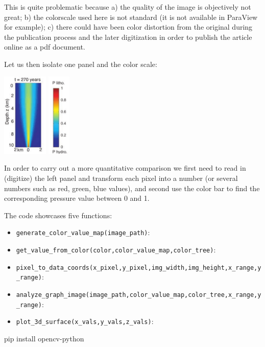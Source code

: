 This is quite problematic because a) the quality of the image is objectively not great; 
b) the colorscale used here is not standard (it is not available in ParaView for example); 
c) there could have been color distortion from the original during the publication 
process and the later digitization in order to publish the article online as a pdf document.

Let us then isolate one panel and the color scale:

\begin{center}
\includegraphics[height=4cm]{python_codes/fieldstone_170/images/graph_3_full}
\includegraphics[height=4cm]{python_codes/fieldstone_170/images/legenda}
\end{center}

In order to carry out a more quantitative comparison
we first need to read in (digitize) the left panel and transform each pixel into 
a number (or several numbers such as red, green, blue values), and second use the 
color bar to find the corresponding pressure value between 0 and 1.

The code showcases five functions:

\begin{itemize}
\item \lstinline{generate_color_value_map(image_path)}:
\item \lstinline{get_value_from_color(color,color_value_map,color_tree)}:
\item \lstinline{pixel_to_data_coords(x_pixel,y_pixel,img_width,img_height,x_range,y_range)}:
\item \lstinline{analyze_graph_image(image_path,color_value_map,color_tree,x_range,y_range)}:
\item \lstinline{plot_3d_surface(x_vals,y_vals,z_vals)}:
\end{itemize}




pip install opencv-python

